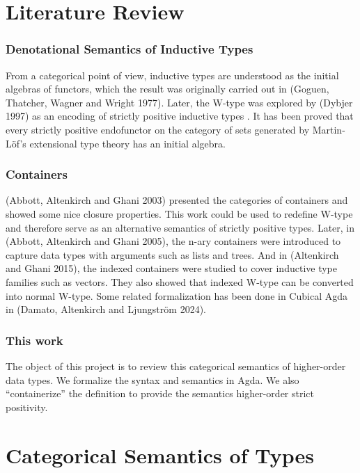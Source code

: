 \section{Literature Review}

\subsubsection*{Denotational Semantics of Inductive Types}

From a categorical point of view, inductive types are understood as the initial algebras of functors, which the result was originally carried out in (Goguen, Thatcher, Wagner and Wright 1977)\cite{goguen1977initial}. Later, the W-type was explored by (Dybjer 1997)\cite{dybjer1997representing} as an encoding of strictly positive inductive types . It has been proved that every strictly positive endofunctor on the category of sets generated by Martin-Löf's extensional type theory has an initial algebra.

\subsubsection*{Containers}

(Abbott, Altenkirch and Ghani 2003)\cite{abbott2003categories} presented the categories of containers and showed some nice closure properties. This work could be used to redefine W-type and therefore serve as an alternative semantics of strictly positive types. Later, in (Abbott, Altenkirch and Ghani 2005)\cite{abbott2005containers}, the n-ary containers were introduced to capture data types with arguments such as lists and trees. And in (Altenkirch and Ghani 2015), the indexed containers were studied to cover inductive type families such as vectors. They also showed that indexed W-type can be converted into normal W-type. Some related formalization has been done in Cubical Agda in (Damato, Altenkirch and Ljungström 2024)\cite{damato2024formalising}.

\subsubsection*{This work}

The object of this project is to review this categorical semantics of higher-order data types. We formalize the syntax and semantics in Agda. We also ``containerize'' the definition to provide the semantics higher-order strict positivity.

\section{Categorical Semantics of Types}

